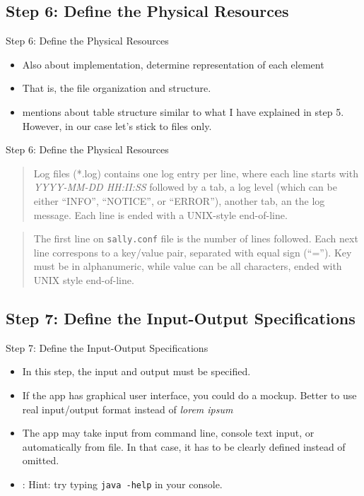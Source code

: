 \documentclass{beamer}
\begin{document}
	\subsection{Step 6: Define the Physical Resources}
	\begin{frame}{Step 6: Define the Physical Resources}
		\begin{itemize}
			\item Also about implementation, determine representation of each element
			\item That is, the file organization and structure.
			\item \cite{Schach:2006:OCS:1207045} mentions about table structure similar to what I have explained in step 5. However, in our case let's stick to files only.
		\end{itemize}
	\end{frame}
	\begin{frame}{Step 6: Define the Physical Resources}
		\begin{small}
			\begin{quote}
			Log files (*.log) contains one log entry per line, where each line starts with \textit{YYYY-MM-DD HH:II:SS} followed by a tab, a log level (which can be either ``INFO'', ``NOTICE'', or ``ERROR''), another tab, an the log message. Each line is ended with a UNIX-style end-of-line.
			\end{quote}
			\begin{quote}
			The first line on \texttt{sally.conf} file is the number of lines followed. Each next line correspons to a key/value pair, separated with equal sign (``=''). Key must be in alphanumeric, while value can be all characters, ended with UNIX style end-of-line.
			\end{quote}
		\end{small}
	\end{frame}	

	\subsection{Step 7: Define the Input-Output Specifications}
	\begin{frame}{Step 7: Define the Input-Output Specifications}
		\begin{itemize}
			\item In this step, the input and output must be specified.
			\item If the app has graphical user interface, you could do a mockup. Better to use real input/output format instead of \textit{lorem ipsum}
			\item The app may take input from command line, console text input, or automatically from file. In that case, it has to be clearly defined instead of omitted.
			\item: Hint: try typing \texttt{java -help} in your console.
		\end{itemize}
	\end{frame}
\end{document}
